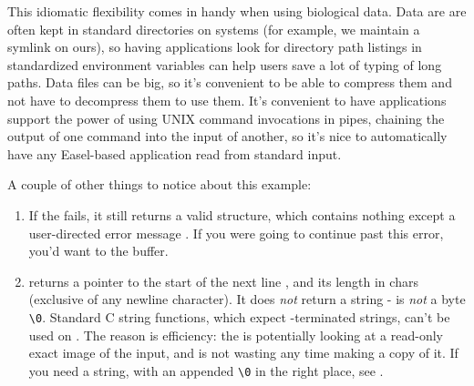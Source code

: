 \begin{userchunk}
\end{userchunk}

\begin{userchunk}
\end{userchunk}

\begin{userchunk}
\end{userchunk}

\begin{userchunk}
\end{userchunk}

This idiomatic flexibility comes in handy when using biological data.
Data are are often kept in standard directories on systems (for
example, we maintain a symlink 
on ours), so having applications look for directory path listings in
standardized environment variables can help users save a lot of typing
of long paths. Data files can be big, so it's convenient to be able to
compress them and not have to decompress them to use them. It's
convenient to have applications support the power of using UNIX
command invocations in pipes, chaining the output of one command into
the input of another, so it's nice to automatically have any
Easel-based application read from standard input.

A couple of other things to notice about this example:

\begin{enumerate}
\item If the  fails, it still returns a
  valid  structure, which contains nothing except a
  user-directed error message . If you were going to
  continue past this error, you'd want to 
  the buffer.

\item {} returns a pointer to the start of
  the next line , and its length in chars 
  (exclusive of any newline character). It does \emph{not} return a
  string -  is \emph{not} a  byte
  \verb+\0+. Standard C string functions, which expect
  -terminated strings, can't be used on . The
  reason is efficiency: the  is potentially looking
  at a read-only exact image of the input, and
   is not wasting any time making a copy
  of it. If you need a string, with an appended \verb+\0+ in the
  right place, see .
\end{enumerate}
  
